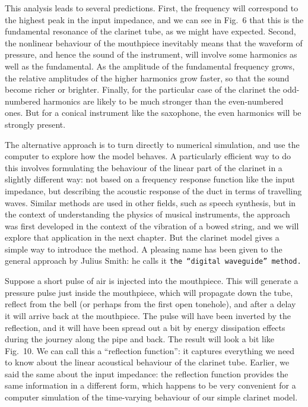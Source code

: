  This analysis leads to several predictions. First, the frequency will 
  correspond to the highest peak in the input impedance, and we can see in 
  Fig.\ 6 that this is the fundamental resonance of the clarinet tube, as we 
  might have expected. Second, the nonlinear behaviour of the mouthpiece 
  inevitably means that the waveform of pressure, and hence the sound of the 
  instrument, will involve some harmonics as well as the fundamental. As the 
  amplitude of the fundamental frequency grows, the relative amplitudes of the 
  higher harmonics grow faster, so that the sound become richer or brighter. 
  Finally, for the particular case of the clarinet the odd-numbered harmonics 
  are likely to be much stronger than the even-numbered ones. But for a conical 
  instrument like the saxophone, the even harmonics will be strongly present. 

  The alternative approach is to turn directly to numerical simulation, and use 
  the computer to explore how the model behaves. A particularly efficient way 
  to do this involves formulating the behaviour of the linear part of the 
  clarinet in a slightly different way: not based on a frequency response 
  function like the input impedance, but describing the acoustic response of 
  the duct in terms of travelling waves. Similar methods are used in other 
  fields, such as speech synthesis, but in the context of understanding the 
  physics of musical instruments, the approach was first developed in the 
  context of the vibration of a bowed string, and we will explore that 
  application in the next chapter. But the clarinet model gives a simple way to 
  introduce the method. A pleasing name has been given to the general approach 
  by Julius Smith: he calls it \tt{}the “digital waveguide” method\rm{}. 

  Suppose a short pulse of air is injected into the mouthpiece. This will 
  generate a pressure pulse just inside the mouthpiece, which will propagate 
  down the tube, reflect from the bell (or perhaps from the first open 
  tonehole), and after a delay it will arrive back at the mouthpiece. The pulse 
  will have been inverted by the reflection, and it will have been spread out a 
  bit by energy dissipation effects during the journey along the pipe and back. 
  The result will look a bit like Fig.\ 10. We can call this a “reflection 
  function”: it captures everything we need to know about the linear acoustical 
  behaviour of the clarinet tube. Earlier, we said the same about the input 
  impedance: the reflection function provides the same information in a 
  different form, which happens to be very convenient for a computer simulation 
  of the time-varying behaviour of our simple clarinet model. 


